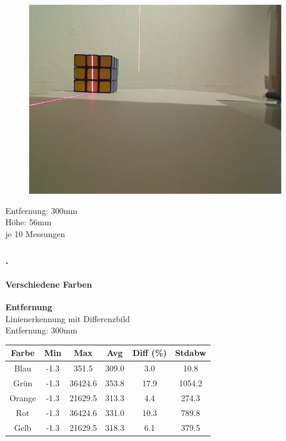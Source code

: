 \documentclass[xcolor=dvipsnames]{beamer}
\def\frametitlesec{\frametitle{\arabic{section}.\hspace{0.5ex}\insertsection}}
\def\framesubtitles#1{\framesubtitle{\hspace{3.5ex}#1}}
\begin{document}
\begin{frame}
\begin{figure}
\begin{minipage}{0.32\linewidth}
		\end{minipage}
		\hfill
		\begin{minipage}{0.32\linewidth}
			\includegraphics[width=\linewidth]{includes/test_color_3}
		\end{minipage}
	\end{figure}
	
	Entfernung: 300mm\\
	Höhe: 56mm\\
	je 10 Messungen
	
\end{frame}
	
\begin{frame}
	\frametitlesec
	\framesubtitles{Verschiedene Farben}
		\textbf{Entfernung}\\
		
		Linienerkennung mit Differenzbild\\
		Entfernung: 300mm
		\begin{tabular}{c|c|c|c|c|c}
			Farbe & Min & Max & Avg & Diff (\%) & Stdabw\\ \hline
Blau &-1.3 & 351.5 & 309.0 & 3.0 & 10.8\\
Grün &-1.3 & 36424.6 & 353.8 & 17.9 & 1054.2\\
Orange &-1.3 & 21629.5 & 313.3 & 4.4 & 274.3\\
Rot &-1.3 & 36424.6 & 331.0 & 10.3 & 789.8\\
Gelb &-1.3 & 21629.5 & 318.3 & 6.1 & 379.5\\
		\end{tabular}
		
\end{frame}
\end{document}

